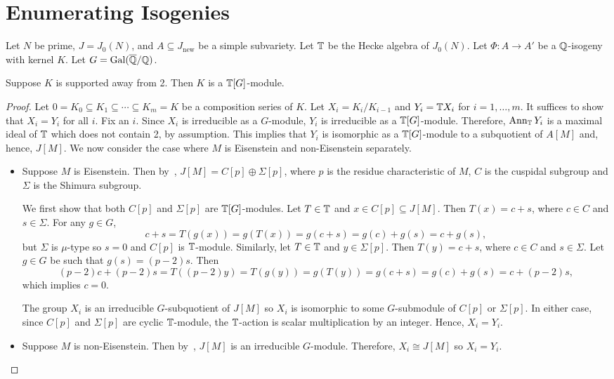 \documentclass{article}
\begin{document}
\section{Enumerating Isogenies}

Let $N$ be prime, $J=J_0(N)$, and $A\subseteq J_\mathrm{new}$ be a simple
subvariety.  Let $\mathbb{T}$ be the Hecke algebra of $J_0(N)$. Let $\Phi:A\to A'$ be
a $\mathbb{Q}$-isogeny with kernel $K$. Let $G=\operatorname{Gal}(\overline{\mathbb{Q}}/\mathbb{Q})$.

\begin{proposition}
    Suppose $K$ is supported away from 2. Then $K$ is a $\mathbb{T}[G]$-module.
\end{proposition}
\begin{proof}
    Let $0=K_0\subseteq K_1\subseteq \cdots \subseteq K_m = K$ be a composition
    series of $K$. Let $X_i = K_i/K_{i-1}$ and $Y_i = \mathbb{T} X_i$ for
    $i=1,\ldots,m$. It suffices to show that $X_i=Y_i$ for all $i$. Fix an $i$.
    Since $X_i$ is irreducible as a $G$-module, $Y_i$ is irreducible as a
    $\mathbb{T}[G]$-module. Therefore, $\operatorname{Ann}_{\mathbb{T}} Y_i$ is a maximal ideal of $\mathbb{T}$
    which does not contain 2, by assumption. This implies that $Y_i$ is
    isomorphic as a $\mathbb{T}[G]$-module to a subquotient of $A[M]$ and, hence,
    $J[M]$. We now consider the case where $M$ is Eisenstein and non-Eisenstein
    separately.
    \begin{itemize}
        \item
            Suppose $M$ is Eisenstein. Then by~\cite[16.2, pg.
            125]{mazur:eisenstein}, $J[M] = C[p]\oplus\Sigma[p]$, where $p$ is
            the residue characteristic of $M$, $C$ is the cuspidal subgroup and
            $\Sigma$ is the Shimura subgroup.

            We first show that both $C[p]$ and $\Sigma[p]$ are $\mathbb{T}[G]$-modules.
            Let $T\in \mathbb{T}$ and $x \in C[p]\subseteq J[M]$. Then $T(x) = c+s$,
            where $c\in C$ and $s\in \Sigma$. For any $g\in G$,
            \[
                c+s = T(g(x)) = g(T(x)) = g(c+s) = g(c) + g(s) = c+g(s),
            \]
            but $\Sigma$ is $\mu$-type so $s=0$ and $C[p]$ is $\mathbb{T}$-module.
            Similarly, let $T\in \mathbb{T}$ and $y\in \Sigma[p]$. Then $T(y) = c+s$,
            where $c\in C$ and $s\in \Sigma$. Let $g\in G$ be such that $g(s) =
            (p-2)s$. Then
            \[
                (p-2)c + (p-2)s=T((p-2)y)=T(g(y)) = g(T(y)) = g(c+s) =
                g(c)+g(s) = c + (p-2)s,
            \]
            which implies $c=0$.

            The group $X_i$ is an irreducible $G$-subquotient of $J[M]$ so
            $X_i$ is isomorphic to some $G$-submodule of $C[p]$ or $\Sigma[p]$.
            In either case, since $C[p]$ and $\Sigma[p]$ are cyclic
            $\mathbb{T}$-module, the $\mathbb{T}$-action is scalar multiplication by an
            integer. Hence, $X_i = Y_i$.
        \item 
            Suppose $M$ is non-Eisenstein. Then by~\cite[14.12, pg.
            122]{mazur:eisenstein}, $J[M]$ is an irreducible $G$-module.
            Therefore, $X_i \cong J[M]$ so $X_i = Y_i$.
    \end{itemize}
\end{proof}
\end{document}
